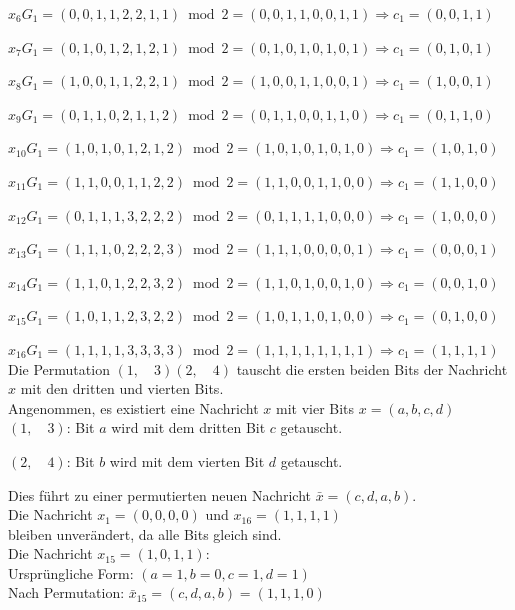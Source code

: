 \begin{Beispiel}
    $x_6G_1= (0,0,1,1,2,2,1,1) \bmod 2 = (0,0,1,1,0,0,1,1) \Rightarrow c_1= (0,0,1,1)$
    
    $x_7G_1= (0,1,0,1,2,1,2,1) \bmod 2 = (0,1,0,1,0,1,0,1) \Rightarrow c_1= (0,1,0,1)$
    
    $x_8G_1= (1,0,0,1,1,2,2,1) \bmod 2 = (1,0,0,1,1,0,0,1) \Rightarrow c_1= (1,0,0,1)$
    
    $x_9G_1= (0,1,1,0,2,1,1,2) \bmod 2 = (0,1,1,0,0,1,1,0) \Rightarrow c_1= (0,1,1,0)$
    
    $x_{10}G_1= (1,0,1,0,1,2,1,2) \bmod 2 = (1,0,1,0,1,0,1,0) \Rightarrow c_1= (1,0,1,0)$
    
    $x_{11}G_1= (1,1,0,0,1,1,2,2) \bmod 2 = (1,1,0,0,1,1,0,0) \Rightarrow c_1= (1,1,0,0)$
    
    $x_{12}G_1= (0,1,1,1,3,2,2,2) \bmod 2 = (0,1,1,1,1,0,0,0) \Rightarrow c_1= (1,0,0,0)$
    
    $x_{13}G_1= (1,1,1,0,2,2,2,3) \bmod 2 = (1,1,1,0,0,0,0,1) \Rightarrow c_1= (0,0,0,1)$
    
    $x_{14}G_1= (1,1,0,1,2,2,3,2) \bmod 2 = (1,1,0,1,0,0,1,0) \Rightarrow c_1= (0,0,1,0)$
    
    $x_{15}G_1= (1,0,1,1,2,3,2,2) \bmod 2 = (1,0,1,1,0,1,0,0) \Rightarrow c_1= (0,1,0,0)$
    
    $x_{16}G_1= (1,1,1,1,3,3,3,3) \bmod 2 = (1,1,1,1,1,1,1,1) \Rightarrow c_1= (1,1,1,1)$\\
    
    Die Permutation $(1,\quad 3)(2,\quad 4)$ tauscht die ersten beiden Bits der Nachricht $x$ mit den dritten und vierten Bits.\\
    Angenommen, es existiert eine Nachricht $x$ mit vier Bits $x = (a,b,c,d)$\\
    
    $(1,\quad 3)$: Bit $a$ wird mit dem dritten Bit $c$ getauscht.
    
    $(2,\quad 4)$: Bit $b$ wird mit dem vierten Bit $d$ getauscht.
    
    Dies führt zu einer permutierten neuen Nachricht $\bar{x}=(c,d,a,b).$\\
    
    Die Nachricht $x_1= (0,0,0,0)$ und $x_{16}=(1,1,1,1)$\\ bleiben unverändert, da alle Bits gleich sind.\\
    
    Die Nachricht $x_{15}=(1,0,1,1)$:\\
    Ursprüngliche Form: $(a= 1, b=0, c=1, d=1)$\\
    Nach Permutation: $\bar{x}_{15}=(c,d,a,b)=(1,1,1,0)$\\
    

\end{Beispiel}

